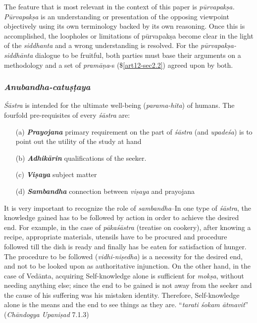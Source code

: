 The feature that is most relevant in the context of this paper is {\sl pūrvapakṣa. Pūrvapakṣa} is an understanding or presentation of the opposing viewpoint objectively using its own terminology backed by its own reasoning. Once this is accomplished, the loopholes or limitations of pūrvapakṣa become clear in the light of the {\sl siddhanta} and a wrong understanding is resolved. For the {\sl pūrvapakṣa-siddhānta} dialogue to be fruitful, both parties must base their arguments on a methodology and a set of {\sl pramāṇa}-s (\$\ref{art12-sec2.2}) agreed upon by both. 

\subsubsection{{\sl\bfseries Anubandha-catuṣṭaya}}\label{art12-sec2.5.4}

{\sl Śāstra} is intended for the ultimate well-being ({\sl parama-hita}) of humans. The fourfold pre-requisites of every {\sl śāstra} are:
\begin{itemize}
\item[(a)] {{\sl\bfseries Prayojana}\relax} primary requirement on the part of {\sl śāstra} (and {\sl upadeśa}) is to point out the utility of the study at hand

\item[(b)] {{\sl\bfseries Adhikārin}\relax} qualiﬁcations of the seeker.

\item[(c)] {{\sl\bfseries Viṣaya}\relax} subject matter

\item[(d)] {{\sl\bfseries Sambandha}\relax} connection between {\sl viṣaya} and prayojana
\end{itemize}

It is very important to recognize the role of {\sl sambandha}--In one type of {\sl śāstra}, the knowledge gained has to be followed by action in order to achieve the desired end. For example, in the case of {\sl pākaśāstra} (treatise on cookery), after knowing a recipe, appropriate materials, utensils have to be procured and procedure followed till the dish is ready and ﬁnally has be eaten for satisfaction of hunger. The procedure to be followed ({\sl vidhi-niṣedha}) is a necessity for the desired end, and not to be looked upon as authoritative injunction. On the other hand, in the case of Vedānta, acquiring Self-knowledge alone is suﬃcient for {\sl mokṣa}, without needing anything else; since the end to be gained is not away from the seeker and the cause of his suffering was his mistaken identity. Therefore, Self-knowledge alone is the means and the end to see things as they are.  ``{\sl tarati śokam ātmavit}'' ({\sl Chāndogya Upaniṣad} 7.1.3)

